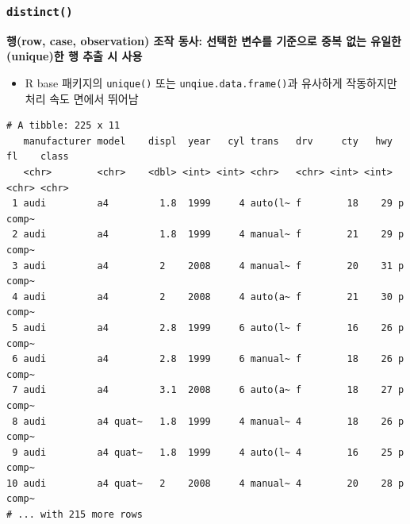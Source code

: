 \documentclass[
  11pt,
]{krantz}
\makeatletter
\newenvironment{Shaded}{\begin{snugshade}}{\end{snugshade}}
\newcommand{\CommentTok}[1]{\textcolor[rgb]{0.37,0.37,0.37}{\textit{#1}}}
\newcommand{\KeywordTok}[1]{\textcolor[rgb]{0.27,0.27,0.27}{\textbf{#1}}}
\newcommand{\NormalTok}[1]{#1}
\newcommand{\OperatorTok}[1]{\textcolor[rgb]{0.43,0.43,0.43}{\textbf{#1}}}
\newcommand{\StringTok}[1]{\textcolor[rgb]{0.5,0.5,0.5}{#1}}
\providecommand{\tightlist}{%
  \setlength{\itemsep}{0pt}\setlength{\parskip}{0pt}}
\newenvironment{kframe}{%
\medskip{}
\setlength{\fboxsep}{.8em}
 \def\at@end@of@kframe{}%
 \ifinner\ifhmode%
  \def\at@end@of@kframe{\end{minipage}}%
  \begin{minipage}{\columnwidth}%
 \fi\fi%
 \def\FrameCommand##1{\hskip\@totalleftmargin \hskip-\fboxsep
 \colorbox{shadecolor}{##1}\hskip-\fboxsep
     \hskip-\linewidth \hskip-\@totalleftmargin \hskip\columnwidth}%
 \MakeFramed {\advance\hsize-\width
   \@totalleftmargin\z@ \linewidth\hsize
   \@setminipage}}%
 {\par\unskip\endMakeFramed%
 \at@end@of@kframe}
\renewenvironment{quote}{\begin{kframe}}{\end{kframe}}
\makeatother
\begin{document}
\normalsize

\hypertarget{dplyr-distinct}{%
\subsubsection*{\texorpdfstring{\texttt{distinct()}}{distinct()}}\label{dplyr-distinct}}


\begin{quote}
\textbf{행(row, case, observation) 조작 동사: 선택한 변수를 기준으로 중복 없는 유일한(unique)한 행 추출 시 사용}
\end{quote}

\begin{itemize}
\tightlist
\item
  R base 패키지의 \texttt{unique()} 또는 \texttt{unqiue.data.frame()}과 유사하게 작동하지만 처리 속도 면에서 뛰어남
\end{itemize}

\footnotesize

\begin{Shaded}
\end{Shaded}

\begin{verbatim}
# A tibble: 225 x 11
   manufacturer model    displ  year   cyl trans   drv     cty   hwy fl    class
   <chr>        <chr>    <dbl> <int> <int> <chr>   <chr> <int> <int> <chr> <chr>
 1 audi         a4         1.8  1999     4 auto(l~ f        18    29 p     comp~
 2 audi         a4         1.8  1999     4 manual~ f        21    29 p     comp~
 3 audi         a4         2    2008     4 manual~ f        20    31 p     comp~
 4 audi         a4         2    2008     4 auto(a~ f        21    30 p     comp~
 5 audi         a4         2.8  1999     6 auto(l~ f        16    26 p     comp~
 6 audi         a4         2.8  1999     6 manual~ f        18    26 p     comp~
 7 audi         a4         3.1  2008     6 auto(a~ f        18    27 p     comp~
 8 audi         a4 quat~   1.8  1999     4 manual~ 4        18    26 p     comp~
 9 audi         a4 quat~   1.8  1999     4 auto(l~ 4        16    25 p     comp~
10 audi         a4 quat~   2    2008     4 manual~ 4        20    28 p     comp~
# ... with 215 more rows
\end{verbatim}
\end{document}
